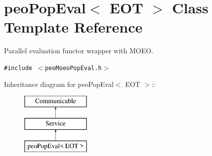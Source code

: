 \hypertarget{classpeoPopEval}{
\section{peo\-Pop\-Eval$<$ EOT $>$ Class Template Reference}
\label{classpeoPopEval}
}
Parallel evaluation functor wrapper with MOEO.  


{\tt \#include $<$peo\-Moeo\-Pop\-Eval.h$>$}

Inheritance diagram for peo\-Pop\-Eval$<$ EOT $>$::\begin{figure}[H]
\begin{center}
\leavevmode
\includegraphics[height=3cm]{classpeoPopEval}
\end{center}
\end{figure}
